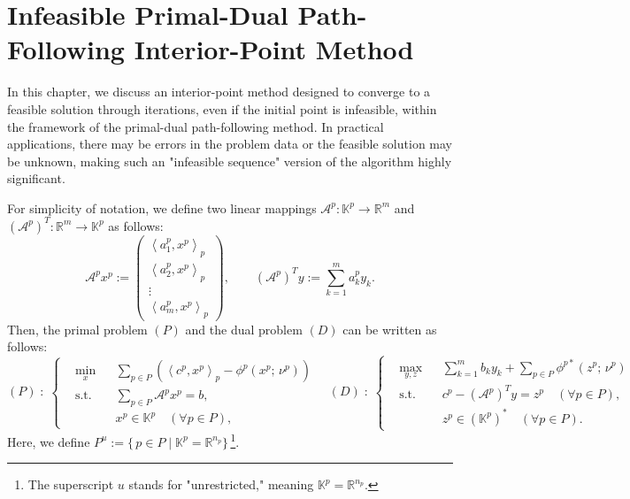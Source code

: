\section{Infeasible Primal-Dual Path-Following Interior-Point Method}
\label{sec:infeasible_IPM}

In this chapter, we discuss an interior-point method designed to converge to a feasible solution through iterations, even if the initial point is infeasible, within the framework of the primal-dual path-following method. In practical applications, there may be errors in the problem data or the feasible solution may be unknown, making such an "infeasible sequence" version of the algorithm highly significant.

\medskip

\noindent
For simplicity of notation, we define two linear mappings 
$\mathcal{A}^p : \mathbb{K}^p \to \mathbb{R}^m$ and 
$(\mathcal{A}^p)^T : \mathbb{R}^m \to \mathbb{K}^p$ 
as follows:
\[
  \mathcal{A}^p x^p
  := 
  \begin{pmatrix}
      \left\langle a^p_1, x^p \right\rangle_p \\
      \left\langle a^p_2, x^p \right\rangle_p \\
      \vdots \\
      \left\langle a^p_m, x^p \right\rangle_p
  \end{pmatrix},
  \qquad
  (\mathcal{A}^p)^T y
  :=
  \sum_{k=1}^m a^p_k y_k.
\]
Then, the primal problem $(P)$ and the dual problem $(D)$ can be written as follows:
\[
  (P)\;:\;
  \left\{
  \begin{aligned}
      &\min_{x}
       && \sum_{p \in P} \left( \left\langle c^p, x^p \right\rangle_p - \phi^p(x^p;\, \nu^p) \right) \\
      &\text{s.t.}
       && \sum_{p \in P} \mathcal{A}^p x^p = b,\\
      & && x^p \in \mathbb{K}^p \quad (\forall p \in P),
  \end{aligned}
  \right.
  \quad
  (D)\;:\;
  \left\{
  \begin{aligned}
      &\max_{y,z}
       && \sum_{k=1}^m b_k y_k 
          + \sum_{p \in P} \phi^{p*}(z^p;\, \nu^p) \\
      &\text{s.t.}
       && c^p - (\mathcal{A}^p)^T y = z^p \quad (\forall p \in P),\\
      & && z^p \in (\mathbb{K}^p)^* \quad (\forall p \in P).
  \end{aligned}
  \right.
\]
Here, we define $P^u := \{\, p \in P \mid \mathbb{K}^p = \mathbb{R}^{n_p} \}\,$\footnote{%
  The superscript $u$ stands for "unrestricted," meaning $\mathbb{K}^p = \mathbb{R}^{n_p}$.
}.


